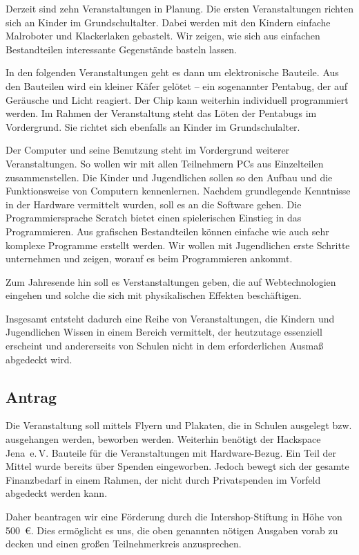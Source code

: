\documentclass{scrartcl}
\begin{document}
Derzeit sind zehn Veranstaltungen in Planung. Die ersten Veranstaltungen
richten sich an Kinder im Grundschultalter. Dabei werden mit den Kindern
einfache Malroboter und Klackerlaken gebastelt. Wir zeigen, wie sich aus
einfachen Bestandteilen interessante Gegenstände basteln lassen.

In den folgenden Veranstaltungen geht es dann um elektronische Bauteile.
Aus den Bauteilen wird ein kleiner Käfer gelötet -- ein sogenannter Pentabug,
der auf Geräusche und Licht reagiert. Der Chip kann weiterhin individuell
programmiert werden. Im Rahmen der Veranstaltung steht das Löten der
Pentabugs im Vordergrund. Sie richtet sich ebenfalls an Kinder im
Grundschulalter.

Der Computer und seine Benutzung steht im Vordergrund weiterer
Veranstaltungen. So wollen wir mit allen Teilnehmern PCs aus Einzelteilen
zusammenstellen. Die Kinder und Jugendlichen sollen so den Aufbau und die
Funktionsweise von Computern kennenlernen. Nachdem grundlegende Kenntnisse in
der Hardware vermittelt wurden, soll es an die Software gehen. Die
Programmiersprache Scratch bietet einen spielerischen Einstieg in das
Programmieren. Aus grafischen Bestandteilen können einfache wie auch sehr
komplexe Programme erstellt werden. Wir wollen mit Jugendlichen erste
Schritte unternehmen und zeigen, worauf es beim Programmieren ankommt.

Zum Jahresende hin soll es Verstanstaltungen geben, die auf Webtechnologien
eingehen und solche die sich mit physikalischen Effekten beschäftigen.

Insgesamt entsteht dadurch eine Reihe von Veranstaltungen, die Kindern und
Jugendlichen Wissen in einem Bereich vermittelt, der heutzutage essenziell
erscheint und andererseits von Schulen nicht in dem erforderlichen Ausmaß
abgedeckt wird.

\subsection{Antrag}
\label{sec:orgheadline4}
Die Veranstaltung soll mittels Flyern und Plakaten, die in Schulen ausgelegt
bzw. ausgehangen werden, beworben werden. Weiterhin benötigt der Hackspace
Jena~e.\,V. Bauteile für die Veranstaltungen mit Hardware-Bezug. Ein Teil
der Mittel wurde bereits über Spenden eingeworben. Jedoch bewegt sich der
gesamte Finanzbedarf in einem Rahmen, der nicht durch Privatspenden im
Vorfeld abgedeckt werden kann.

Daher beantragen wir eine Förderung durch die Intershop-Stiftung in Höhe von
500~\euro. Dies ermöglicht es uns, die oben genannten nötigen Ausgaben
vorab zu decken und einen großen Teilnehmerkreis anzusprechen.
\end{document}
